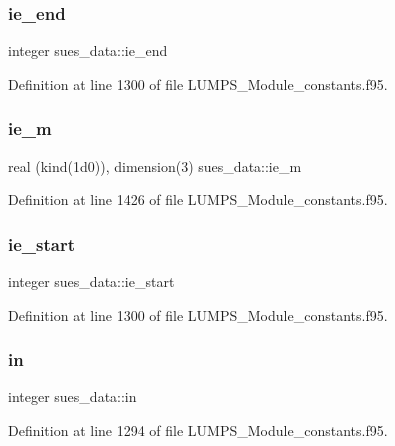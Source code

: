 \subsubsection{\texorpdfstring{ie\+\_\+end}{ie\_end}}
{\footnotesize\ttfamily integer sues\+\_\+data\+::ie\+\_\+end}



Definition at line 1300 of file L\+U\+M\+P\+S\+\_\+\+Module\+\_\+constants.\+f95.

\mbox{\label{namespacesues__data_acc07bf45b728dde4f2c1e0063f79808e}} 
\subsubsection{\texorpdfstring{ie\+\_\+m}{ie\_m}}
{\footnotesize\ttfamily real (kind(1d0)), dimension(3) sues\+\_\+data\+::ie\+\_\+m}



Definition at line 1426 of file L\+U\+M\+P\+S\+\_\+\+Module\+\_\+constants.\+f95.

\mbox{\label{namespacesues__data_a64de572d5505a9ff4174a4703db24a9e}} 
\subsubsection{\texorpdfstring{ie\+\_\+start}{ie\_start}}
{\footnotesize\ttfamily integer sues\+\_\+data\+::ie\+\_\+start}



Definition at line 1300 of file L\+U\+M\+P\+S\+\_\+\+Module\+\_\+constants.\+f95.

\mbox{\label{namespacesues__data_ae5a31f2a4addf36e077f1e18eabf6052}} 
\subsubsection{\texorpdfstring{in}{in}}
{\footnotesize\ttfamily integer sues\+\_\+data\+::in}



Definition at line 1294 of file L\+U\+M\+P\+S\+\_\+\+Module\+\_\+constants.\+f95.

